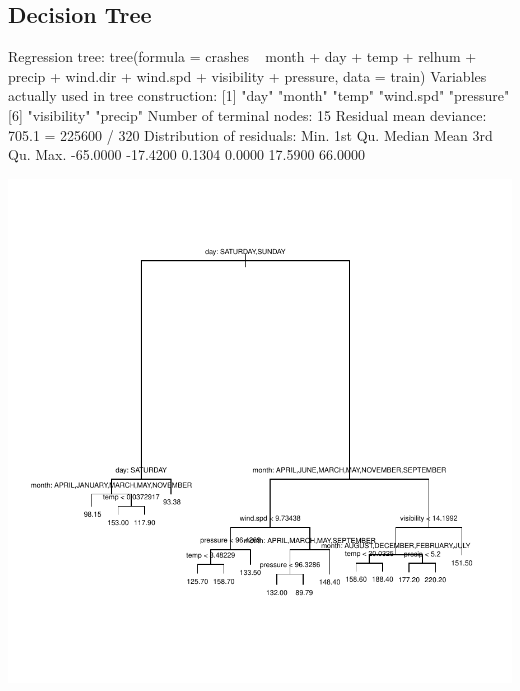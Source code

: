 \documentclass[11pt, a4paper]{article}
\begin{document}
\subsection{Decision Tree}

\begin{Schunk}
\begin{Soutput}
Regression tree:
tree(formula = crashes ~ month + day + temp + relhum + precip + 
    wind.dir + wind.spd + visibility + pressure, data = train)
Variables actually used in tree construction:
[1] "day"        "month"      "temp"       "wind.spd"   "pressure"  
[6] "visibility" "precip"    
Number of terminal nodes:  15 
Residual mean deviance:  705.1 = 225600 / 320 
Distribution of residuals:
    Min.  1st Qu.   Median     Mean  3rd Qu.     Max. 
-65.0000 -17.4200   0.1304   0.0000  17.5900  66.0000 
\end{Soutput}
\end{Schunk}
\includegraphics{regression-021}
\end{document}
